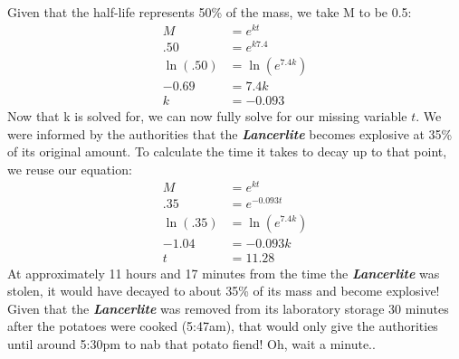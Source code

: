 \documentclass{article}
\begin{document}
Given that the half-life represents 50\% of the mass, we take M to be 0.5:
\begin{align}
    M &= e^{kt}\\[1em]
    .50 &= e^{k7.4}\\[1em]
    \ln(.50) &= \ln(e^{7.4k})\\[1em]
    -0.69 &= 7.4k \\[1em]
    k &= -0.093
\end{align}
Now that k is solved for, we can now fully solve for our missing variable $t$. We were informed by the authorities that the \textbf{\textit{Lancerlite}} becomes explosive at 35\% of its original amount. To calculate the time it takes to decay up to that point, we reuse our equation:
\begin{align}
    M &= e^{kt}\\[1em]
    .35 &= e^{-0.093t}\\[1em]
    \ln(.35) &= \ln(e^{7.4k})\\[1em]
    -1.04 &= -0.093k \\[1em]
    t &= 11.28
\end{align}
At approximately 11 hours and 17 minutes from the time the \textbf{\textit{Lancerlite}} was stolen, it would have decayed to about 35\% of its mass and become explosive! Given that the \textbf{\textit{Lancerlite}} was removed from its laboratory storage 30 minutes after the potatoes were cooked (5:47am), that would only give the authorities until around 5:30pm to nab that potato fiend! Oh, wait a minute..
\end{document}
